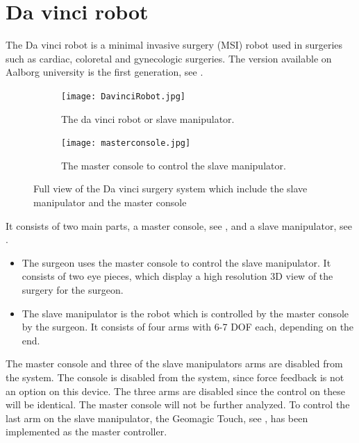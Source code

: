 \section{Da vinci robot}\label{sec:da_vin_rob}

The Da vinci robot is a minimal invasive surgery (MSI) robot used in surgeries such as cardiac, coloretal and gynecologic surgeries\cite{daVinciSurgery}. The version available on Aalborg university is the first generation, see .

\begin{figure}[H]
	\centering
	\begin{subfigure}{.45\textwidth}
		\centering
		\texttt{[image: DavinciRobot.jpg]}
		\caption{The da vinci robot or slave manipulator.}
		\label{fig:davincirobot}
	\end{subfigure}
	\begin{subfigure}{.45\textwidth}
		\centering
		\vspace{12pt}
		\texttt{[image: masterconsole.jpg]}
		\caption{The master console to control the slave manipulator.}
		\label{fig:mastermani}
	\end{subfigure}
\caption{Full view of the Da vinci surgery system which include the slave manipulator and the master console}
\label{fig:fulldavinci}
\end{figure}

It consists of two main parts, a master console, see , and a slave manipulator, see .

\begin{itemize}
\item The surgeon uses the master console to control the slave manipulator. It consists of two eye pieces, which display a high resolution 3D view of the surgery for the surgeon. 
\item The slave manipulator is the robot which is controlled by the master console by the surgeon. It consists of four arms with 6-7 \gls{DOF} each, depending on the end.
\end{itemize}

The master console and three of the slave manipulators arms are disabled from the system. The console is disabled from the system, since force feedback is not an option on this device. The three arms are disabled since the control on these will be identical. The master console will not be further analyzed. To control the last arm on the slave manipulator, the Geomagic Touch, see , has been implemented as the master controller.

